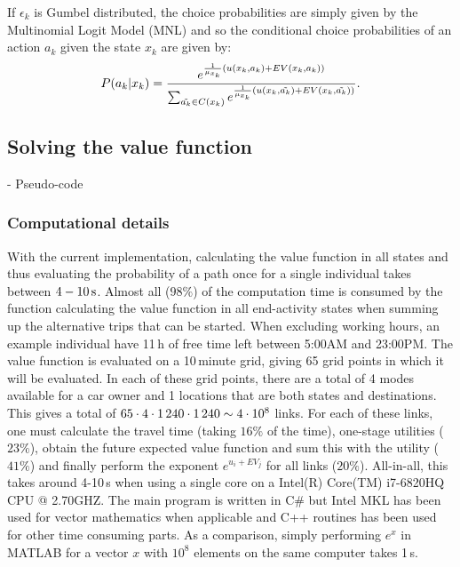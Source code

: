 If $\epsilon_k$ is Gumbel distributed, the choice probabilities are simply given by the Multinomial Logit Model (MNL) and so the conditional choice probabilities of an action $a_k$ given the state $x_k$ are given by:
\newcommand{\akt}{\tilde{a_k}}
\begin{equation} \label{eq:pcond}
P(a_k|x_k) = \frac{e^{\frac{1}{\mu_{x_k}}\left(\avgu(x_k,a_k) + \eutil(x_k,a_k)\right)}}{\sum_{\akt \in C(x_k)}e^{\frac{1}{\mu_{x_k}}\left(\avgu(x_k,\akt) + \eutil(x_k,\akt)\right)}}.
\end{equation}


\subsection{Solving the value function}
- Pseudo-code


\subsubsection{Computational details}
\label{seq:computationTime}

With the current implementation, calculating the value function in all states and thus evaluating the probability of a path once for a single individual takes between $4-10\, \mathrm{s}$. Almost all ($98\%$) of the computation time is consumed by the function calculating the value function in all end-activity states when summing up the alternative trips that can be started. When excluding working hours, an example individual have 11\,h of free time left between 5:00AM and 23:00PM. The value function is evaluated on a 10\,minute grid, giving 65 grid points in which it will be evaluated. In each of these grid points, there are a total of 4 modes available for a car owner and 1 locations that are both states and destinations. This gives a total of $65 \cdot 4 \cdot 1\, 240 \cdot 1\, 240 \sim 4 \cdot 10^8$ links. For each of these links, one must calculate the travel time (taking $16\%$ of the time), one-stage utilities ($23\%$), obtain the future expected value function and sum this with the utility ($41\%$) and finally perform the exponent $e^{u_i + EV_j}$ for all links ($20\%$). All-in-all, this takes around 4-10\,s when using a single core on a Intel(R) Core(TM) i7-6820HQ CPU @ 2.70GHZ. The main program is written in C\# but Intel MKL has been used for vector mathematics when applicable and C++ routines has been used for other time consuming parts. As a comparison, simply performing $e^x$ in MATLAB for a vector $x$ with $10^8$ elements on the same computer takes 1\,s. 

